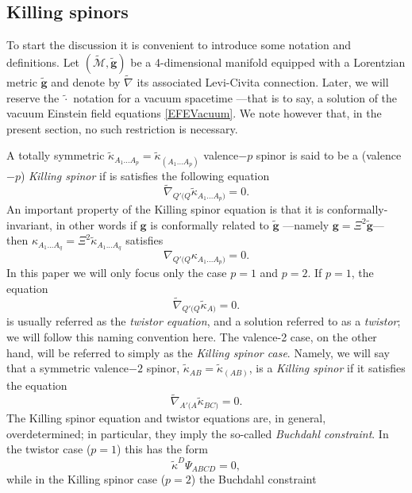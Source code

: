 \documentclass[10pt,a4paper]{article}
\theoremstyle{plain}
\def\bmg{{\bm g}}
\begin{document}
\subsection{Killing spinors}\label{Sec:KillingSpinors}

To start the discussion it is convenient to introduce some notation
and definitions. Let $(\tilde{\mathcal{M}},\tilde{\bmg})$ be a
4-dimensional manifold equipped with a Lorentzian metric
$\tilde{\bmg}$ and denote by $\tilde{\nabla}$ its associated
Levi-Civita connection.  Later, we will reserve the $\tilde{\cdot}$
notation for a vacuum spacetime ---that is to say, a solution of the
vacuum Einstein field equations \eqref{EFEVacuum}. We note however
that, in the present section, no such restriction is necessary.
\medskip

A totally symmetric
$\tilde{\kappa}_{A_1...A_p}=\tilde{\kappa}_{(A_1...A_p)}$ valence$-p$
spinor is said to be a (valence$-p$) \emph{Killing spinor} if is
satisfies the following equation
\begin{equation}\label{qValenceKillingspinor}
\tilde{\nabla}_{Q'(Q}\tilde{\kappa}_{A_1...A_p)}=0.
\end{equation}
An important property of the Killing spinor equation is that it is
conformally-invariant, in other words if $\bmg$ is conformally related
to $\tilde{\bmg}$ ---namely $\bmg=\Xi^2\tilde{\bmg}$--- then
${\kappa}_{A_1...A_q}=\Xi^2 \tilde{\kappa}_{A_1...A_q}$ satisfies
\[{\nabla}_{Q'(Q}{\kappa}_{A_1...A_p)}=0.\]
\medskip
\noindent In this paper we will only focus only the case $p=1$ and
$p=2$.  If $p=1$, the equation
\begin{equation}\label{TwistorEq}
  \tilde{\nabla}_{Q'(Q}\tilde{\kappa}_{A)}=0.
\end{equation}
is usually referred as the \emph{twistor equation}, and a solution
referred to as a \emph{twistor}; we will follow this naming convention
here.  The valence-2 case, on the other hand, will be referred to
simply as the \emph{Killing spinor case}.  Namely, we will say that a
symmetric valence$-2$ spinor,
$\tilde{\kappa}_{AB}=\tilde{\kappa}_{(AB)}$, is a \textit{Killing
  spinor} if it satisfies the equation
\begin{equation}
\tilde{\nabla}_{A'(A}\tilde{\kappa}_{BC)}=0.
\end{equation}
The Killing spinor equation and twistor equations are, in general,
overdetermined; in particular, they imply the so-called
\textit{Buchdahl constraint}.  In the twistor case ($p=1$) this has
the form
\[
\tilde{\kappa}^D\Psi_{ABCD}=0,
\]
while in the Killing spinor case ($p=2$) the Buchdahl constraint
\end{document}
